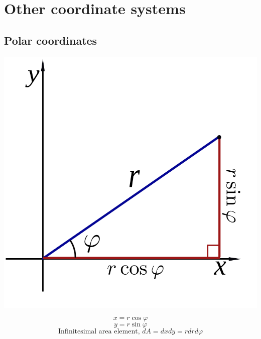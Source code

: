 \documentclass[11pt]{article}
\begin{document}
 \newpage

\section{Other coordinate systems}
\label{sec:org4cd9689}

\subsection{Polar coordinates}
\label{sec:org598e41e}
\begin{center}
\includegraphics[width=.9\linewidth]{./images/polar-coordinates.png}
\end{center}
\[x = r \cos \varphi\]
\[y = r \sin \varphi\]
\[\text{Infinitesimal area element, } dA = dx dy = r dr d \varphi\]
\end{document}
